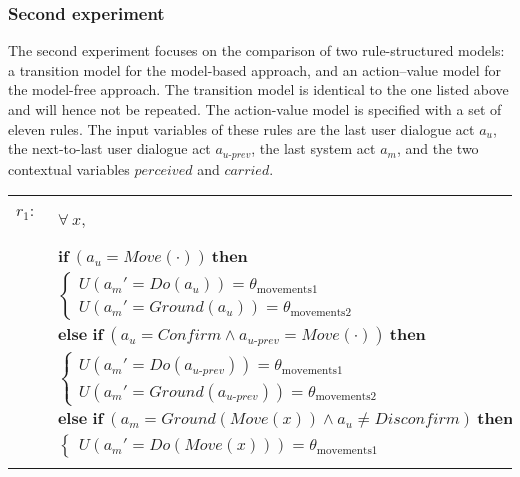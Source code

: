\subsubsection*{Second experiment}

The second experiment focuses on the comparison of two rule-structured models: a transition model for the model-based approach, and an action--value model for the model-free approach. The transition model is identical to the one listed above and will hence not be repeated.  The action-value model is specified with a set of eleven rules.  The input variables of these rules are the last user dialogue act $a_u$, the next-to-last user dialogue act $a_{u\mbox{-}prev}$, the last system act $a_m$, and the two contextual variables $\mathit{perceived}$ and $\mathit{carried}$. 

\begin{footnotesize}
\begin{longtable}{p{1cm}p{14cm}}
$r_{1}$: \ \ & $\forall \ x, $ \\ & $ \textbf{if} \ (\mathit{a_u}\!=\!\mathit{Move(\cdot)}) \ \textbf{then} $ \\
 & \;\;\;\;\; $ \begin{cases}U(\mathit{a_m}'\!=\!\mathit{Do({a_u})})\!=\!\theta_{\mathrm{movements1}} \\
U(\mathit{a_m}'\!=\!\mathit{Ground({a_u})})\!=\!\theta_{\mathrm{movements2}} \end{cases}$ \vspace{1mm} \\ & $ \textbf{else if} \ (\mathit{a_u}\!=\!\mathit{Confirm} \land \mathit{a_{u\mbox{-}prev}}\!=\!\mathit{Move(\cdot)}) \ \textbf{then}$ \\
& \;\;\;\;\; $ \begin{cases}U(\mathit{a_m}'\!=\!\mathit{Do({a_{u\mbox{-}prev}})})\!=\!\theta_{\mathrm{movements1}} \\
U(\mathit{a_m}'\!=\!\mathit{Ground({a_{u\mbox{-}prev}})})\!=\!\theta_{\mathrm{movements2}} \end{cases}$ \vspace{1mm} \\ & $ \textbf{else if} \ (\mathit{a_m}\!=\!\mathit{Ground(Move({x}))} \land \mathit{a_u}\!\neq\!\mathit{Disconfirm}) \ \textbf{then}$ \\
& \;\;\;\;\; $ \begin{cases}U(\mathit{a_m}'\!=\!\mathit{Do(Move({x}))})\!=\!\theta_{\mathrm{movements1}} \end{cases}$ \\ \\[-1mm]

\end{longtable}
\end{footnotesize}
